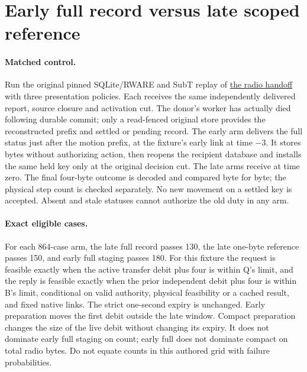 \documentclass{article}
\begin{document}
\section*{Early full record versus late scoped reference}
\paragraph{Matched control.}
Run the original pinned SQLite/RWARE and SubT replay of
\href{https://github.com/eternal-november/eos-research-programmes/pull/814}{the radio handoff}
with three presentation policies. Each receives the same independently
delivered report, source closure and activation cut. The donor's worker
has actually died following durable commit; only a read-fenced original
store provides the reconstructed prefix and settled or pending record.
The early arm delivers the full status just after the motion prefix,
at the fixture's early link at time $-3$. It stores bytes without
authorizing action, then reopens the recipient database and installs
the same held key only at the original decision cut. The late arms
receive at time zero. The final four-byte outcome is decoded and
compared byte for byte; the physical step count is checked separately.
No new movement on a settled key is accepted. Absent and stale
statuses cannot authorize the old duty in any arm.

\paragraph{Exact eligible cases.}
For each 864-case arm, the late full record passes 130, the late
one-byte reference passes 150, and early full staging passes 180.
For this fixture the request is feasible exactly when the active
transfer debit plus four is within Q's limit, and the reply is
feasible exactly when the prior independent debit plus four is within
B's limit, conditional on valid authority, physical feasibility or a
cached result, and fixed native links. The strict one-second expiry
is unchanged. Early preparation moves the first debit outside the
late window. Compact preparation changes the size of the live debit
without changing its expiry. It does not dominate early full staging
on count; early full does not dominate compact on total radio bytes.
Do not equate counts in this authored grid with failure probabilities.
\end{document}
